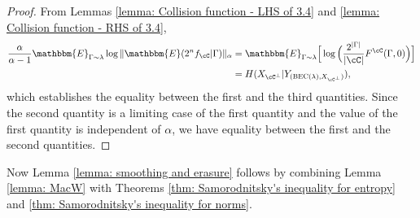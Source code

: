 \documentclass{amsart}
\theoremstyle{remark}
\begin{document}
\begin{proof}
 From Lemmas \ref{lemma: Collision function - LHS of 3.4} and \ref{lemma: Collision function - RHS of 3.4}, 
\begin{align*}
    \frac{\alpha}{\alpha -1} \mathbbm{E}_{\Gamma\sim \lambda}\log\|\mathbbm{E}(2^nf_{\cC}|\Gamma)\|_\alpha
    &= \mathbbm{E}_{\Gamma\sim \lambda}\Big[\log \Big(\frac{2^{|\Gamma|}}{{|\cC|}} F^{\cC}(\Gamma,0)\Big) \Big]\\ 
    &= H(X_{\cC^{\bot}}|Y_{({\text{\rm BEC}}(\lambda), X_{\cC^{\bot}})}),
\end{align*} 
which establishes the equality between the first and the third quantities. Since the second quantity is a limiting case of the first quantity and the value of the first quantity is independent of $\alpha$, we have equality between the first and the second quantities.
\end{proof}
Now Lemma \ref{lemma: smoothing and erasure} follows by
combining Lemma \ref{lemma: MacW} with Theorems \ref{thm: Samorodnitsky's inequality for entropy} and \ref{thm: Samorodnitsky's inequality for norms}.


\end{document}
